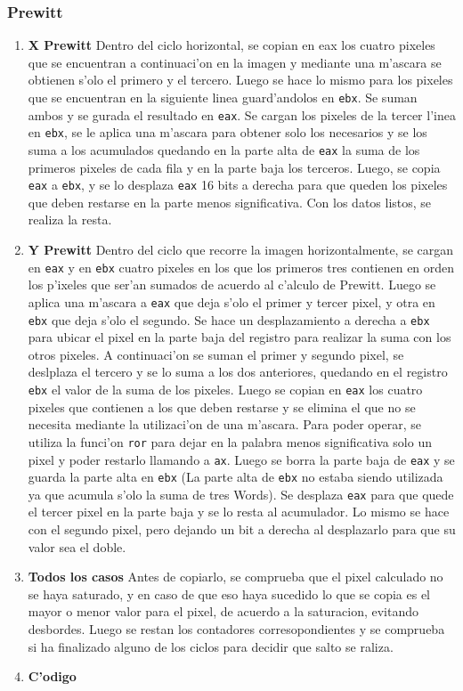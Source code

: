 \documentclass[11pt]{article}
\begin{document}
\subsubsection{Prewitt} 
\begin{enumerate}
\item \textbf{X Prewitt}
\subitem Dentro del ciclo horizontal, se copian en eax los cuatro pixeles que se encuentran a continuaci'on en la imagen y mediante una m'ascara se obtienen s'olo el primero y el tercero. Luego se hace lo mismo para los pixeles que se encuentran en la siguiente linea guard'andolos en \verb'ebx'. Se suman ambos y se gurada el resultado en \verb'eax'.
Se cargan los pixeles de la tercer l'inea en \verb'ebx', se le aplica una m'ascara para obtener solo los necesarios y se los suma a los acumulados quedando en la parte alta de \verb'eax' la suma de los primeros pixeles de cada fila y en la parte baja los terceros. Luego, se copia  \verb'eax' a \verb'ebx', y se lo desplaza \verb'eax' 16 bits a derecha para que queden los pixeles que deben restarse en la parte menos significativa.
Con los datos listos, se realiza la resta.
\item \textbf{Y Prewitt}
\subitem Dentro del ciclo que recorre la imagen horizontalmente, se cargan en \verb'eax' y en \verb'ebx' cuatro pixeles en los que los primeros tres contienen en orden los p'ixeles que ser'an sumados de acuerdo al c'alculo de Prewitt.
Luego se aplica una m'ascara a \verb'eax' que deja s'olo el primer y tercer pixel, y otra en \verb'ebx' que deja s'olo el segundo. Se hace un desplazamiento a derecha a \verb'ebx' para ubicar el pixel en la parte baja del registro para realizar la suma con los otros pixeles. A continuaci'on se suman el primer y segundo pixel, se deslplaza el tercero y se lo suma a los dos anteriores, quedando en el registro \verb'ebx' el valor de la suma de los pixeles.
Luego se copian en \verb'eax' los cuatro pixeles que contienen a los que deben restarse y se elimina el que no se necesita mediante la utilizaci'on de una m'ascara. Para poder operar, se utiliza la funci'on \verb'ror' para dejar en la palabra menos significativa solo un pixel y poder restarlo llamando a \verb'ax'. Luego se borra la parte baja de \verb'eax' y se guarda la parte alta en \verb'ebx' (La parte alta de \verb'ebx' no estaba siendo utilizada ya que acumula s'olo la suma de tres Words). Se desplaza \verb'eax' para que quede el tercer pixel en la parte baja y se lo resta al acumulador. Lo mismo se hace con el segundo pixel, pero dejando un bit a derecha al desplazarlo para que su valor sea el doble.
\item \textbf{Todos los casos}
\subitem Antes de copiarlo, se comprueba que el pixel calculado no se haya saturado, y en caso de que eso haya sucedido lo que se copia es el mayor o menor valor para el pixel, de acuerdo a la saturacion, evitando desbordes.
Luego se restan los contadores corresopondientes y se comprueba si ha finalizado alguno de los ciclos para decidir que salto se raliza.
\item \textbf{C'odigo}
\end{enumerate}
\end{document}
